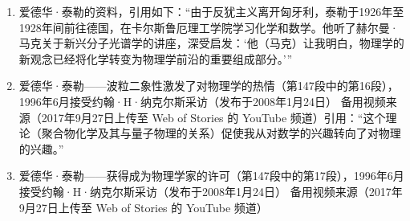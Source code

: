 \begin{enumerate}
\item 爱德华·泰勒的资料，引用如下：“由于反犹主义离开匈牙利，泰勒于1926年至1928年间前往德国，在卡尔斯鲁厄理工学院学习化学和数学。他听了赫尔曼·马克关于新兴分子光谱学的讲座，深受启发：‘他（马克）让我明白，物理学的新观念已经将化学转变为物理学前沿的重要组成部分。’”
\item 爱德华·泰勒——波粒二象性激发了对物理学的热情（第147段中的第16段），1996年6月接受约翰·H·纳克尔斯采访（发布于2008年1月24日）
备用视频来源（2017年9月27日上传至 Web of Stories 的 YouTube 频道）引用：“这个理论（聚合物化学及其与量子物理的关系）促使我从对数学的兴趣转向了对物理的兴趣。”
\item 爱德华·泰勒——获得成为物理学家的许可（第147段中的第17段），1996年6月接受约翰·H·纳克尔斯采访（发布于2008年1月24日）
备用视频来源（2017年9月27日上传至 Web of Stories 的 YouTube 频道）
\end{enumerate}